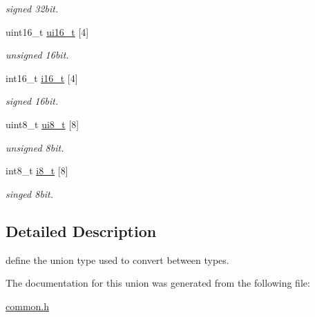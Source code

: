 \begin{DoxyCompactItemize}
\begin{DoxyCompactList}\small\item\em signed 32bit. \end{DoxyCompactList}\item 
\hypertarget{union_data_converter_ae96584b1dad4adab583405970fc89137}{uint16\-\_\-t \hyperlink{union_data_converter_ae96584b1dad4adab583405970fc89137}{ui16\-\_\-t} \mbox{[}4\mbox{]}}\label{union_data_converter_ae96584b1dad4adab583405970fc89137}

\begin{DoxyCompactList}\small\item\em unsigned 16bit. \end{DoxyCompactList}\item 
\hypertarget{union_data_converter_ad566a31830c516b559b9a3758ad39d82}{int16\-\_\-t \hyperlink{union_data_converter_ad566a31830c516b559b9a3758ad39d82}{i16\-\_\-t} \mbox{[}4\mbox{]}}\label{union_data_converter_ad566a31830c516b559b9a3758ad39d82}

\begin{DoxyCompactList}\small\item\em signed 16bit. \end{DoxyCompactList}\item 
\hypertarget{union_data_converter_a6576e61c59bc9d4e1b54f881fe5acdd4}{uint8\-\_\-t \hyperlink{union_data_converter_a6576e61c59bc9d4e1b54f881fe5acdd4}{ui8\-\_\-t} \mbox{[}8\mbox{]}}\label{union_data_converter_a6576e61c59bc9d4e1b54f881fe5acdd4}

\begin{DoxyCompactList}\small\item\em unsigned 8bit. \end{DoxyCompactList}\item 
\hypertarget{union_data_converter_a0b79bc0f32d5bc76317f226dfc1a0325}{int8\-\_\-t \hyperlink{union_data_converter_a0b79bc0f32d5bc76317f226dfc1a0325}{i8\-\_\-t} \mbox{[}8\mbox{]}}\label{union_data_converter_a0b79bc0f32d5bc76317f226dfc1a0325}

\begin{DoxyCompactList}\small\item\em singed 8bit. \end{DoxyCompactList}\end{DoxyCompactItemize}


\subsection{Detailed Description}
define the union type used to convert between types. 

The documentation for this union was generated from the following file\-:\begin{DoxyCompactItemize}
\item 
\hyperlink{common_8h}{common.\-h}\end{DoxyCompactItemize}
